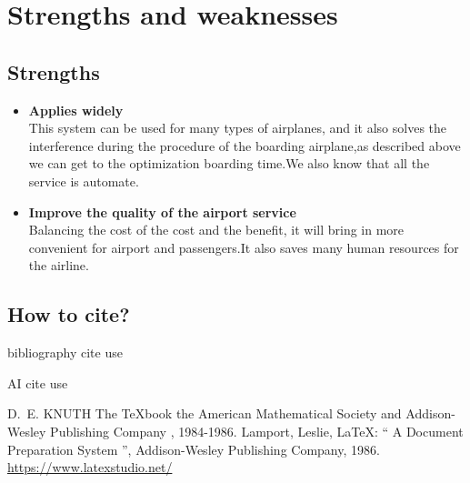\documentclass{mcmthesis}
\begin{document}
\section{Strengths and weaknesses}
\lipsum[12]

\subsection{Strengths}
\begin{itemize}
\item \textbf{Applies widely}\\
This  system can be used for many types of airplanes, and it also
solves the interference during  the procedure of the boarding
airplane,as described above we can get to the  optimization
boarding time.We also know that all the service is automate.
\item \textbf{Improve the quality of the airport service}\\
Balancing the cost of the cost and the benefit, it will bring in
more convenient  for airport and passengers.It also saves many
human resources for the airline.
\end{itemize}

\subsection{How to cite?}
bibliography cite use \cite{1,2,3}

AI cite use 

\begin{thebibliography}{99}
 D.~E. KNUTH   The \TeX{}book  the American
Mathematical Society and Addison-Wesley
Publishing Company , 1984-1986.
Lamport, Leslie,  \LaTeX{}: `` A Document Preparation System '',
Addison-Wesley Publishing Company, 1986.
\url{https://www.latexstudio.net/}
\end{thebibliography}
\end{document}
